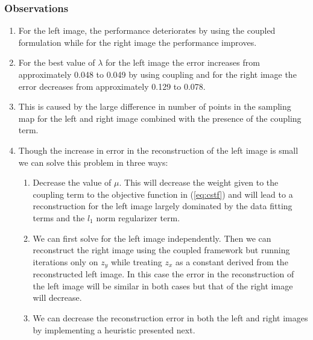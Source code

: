 \subsubsection{Observations}
\begin{enumerate}
\item For the left image, the performance deteriorates by using the coupled formulation while for the right image the performance improves.
\item For the best value of $\lambda$ for the left image the error increases from approximately 0.048 to 0.049 by using coupling and for the right image the error decreases from approximately  0.129 to 0.078.
\item This is caused by the large difference in number of points in the sampling map for the left and right image combined with the presence of the coupling term.
 \item Though the increase in error in the reconstruction of the left image is small we can solve this problem in three ways:
\begin{enumerate}
\item Decrease the value of $\mu$. This will decrease the weight given to the coupling term to the objective function in (\ref{eq:cstf}) and will lead to a reconstruction for the left image largely dominated by the data fitting terms and the $l_1$ norm regularizer term.
\item We can first solve for the left image independently. Then we can reconstruct the right image using the coupled framework but running iterations only on $z_y$ while treating $z_x$ as a constant derived from the reconstructed left image. In this case the error in the reconstruction of the left image will be similar in both cases but that of the right image will decrease.
\item We can decrease the reconstruction error in both the left and right images by implementing a heuristic presented next.
\end{enumerate}
\end{enumerate}


